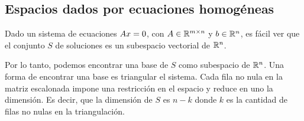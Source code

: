 %
%
%

\subsection{Espacios dados por ecuaciones homog\'eneas}

Dado un sistema de ecuaciones $\Ab \xb = \cero$, con $\Ab \in \R^{m \times n}$ y $\bb \in \R^n$, es fácil ver que el conjunto $S$ de soluciones es un subespacio vectorial de $\mathbb R^n$.

Por lo tanto, podemos encontrar una base de $S$ como subespacio de $\mathbb R^n$. Una forma de encontrar una base es triangular el sistema. Cada fila no nula en la matriz escalonada impone una restricción en el espacio y reduce en uno la dimensión. Es decir, que la dimensión de $S$ es $n - k$ donde $k$ es la cantidad de filas no nulas en la triangulación.


